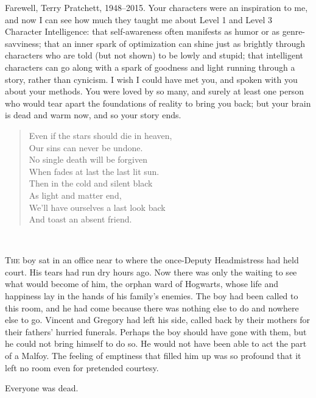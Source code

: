 
\begin{chapterOpeningAuthorNote}
Farewell, Terry Pratchett, 1948--2015. Your characters were an inspiration to me, and now I can see how much they taught me about Level 1 and Level 3 Character Intelligence: that self-awareness often manifests as humor or as genre-savviness; that an inner spark of optimization can shine just as brightly through characters who are told (but not shown) to be lowly and stupid; that intelligent characters can go along with a spark of goodness and light running through a story, rather than cynicism. I wish I could have met you, and spoken with you about your methods. You were loved by so many, and surely at least one person who would tear apart the foundations of reality to bring you back; but your brain is dead and warm now, and so your story ends.
\begin{verse}
Even if the stars should die in heaven, \\
Our sins can never be undone. \\
No single death will be forgiven \\
When fades at last the last lit sun. \\
Then in the cold and silent black \\
As light and matter end, \\
We'll have ourselves a last look back \\
And toast an absent friend. \\
\end{verse}
~
\end{chapterOpeningAuthorNote}

\lettrine{T}{he} boy sat in an office near to where the once-Deputy Headmistress had held court. His tears had run dry hours ago. Now there was only the waiting to see what would become of him, the orphan ward of Hogwarts, whose life and happiness lay in the hands of his family's enemies. The boy had been called to this room, and he had come because there was nothing else to do and nowhere else to go. Vincent and Gregory had left his side, called back by their mothers for their fathers' hurried funerals. Perhaps the boy should have gone with them, but he could not bring himself to do so. He would not have been able to act the part of a Malfoy. The feeling of emptiness that filled him up was so profound that it left no room even for pretended courtesy.

Everyone was dead.

